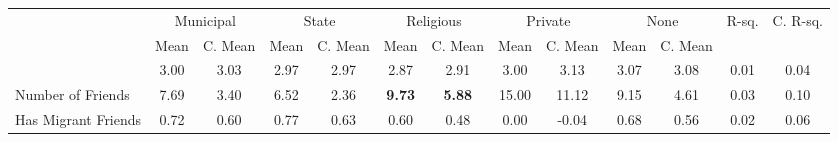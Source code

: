 \begin{tabular}{l c c c c c c c c c c c c}
\toprule
& \multicolumn{2}{c}{Municipal} & \multicolumn{2}{c}{State} & \multicolumn{2}{c}{Religious} & \multicolumn{2}{c}{Private} & \multicolumn{2}{c}{None} & R-sq. & C. R-sq. \\
& \scriptsize Mean & \scriptsize C. Mean & \scriptsize Mean & \scriptsize C. Mean & \scriptsize Mean & \scriptsize C. Mean & \scriptsize Mean & \scriptsize C. Mean & \scriptsize Mean & \scriptsize C. Mean & & \\
\midrule
&      3.00 & 3.03 &      2.97 & 2.97 &      2.87 & 2.91 &      3.00 & 3.13 &      3.07 & 3.08 &      0.01 &      0.04 \\
Number of Friends &      7.69 & 3.40 &      6.52 & 2.36 & \textbf{     9.73} & \textbf{     5.88} &     15.00 & 11.12 &      9.15 & 4.61 &      0.03 &      0.10 \\
Has Migrant Friends &      0.72 & 0.60 &      0.77 & 0.63 &      0.60 & 0.48 &      0.00 & -0.04 &      0.68 & 0.56 &      0.02 &      0.06 \\
\bottomrule
\end{tabular}
